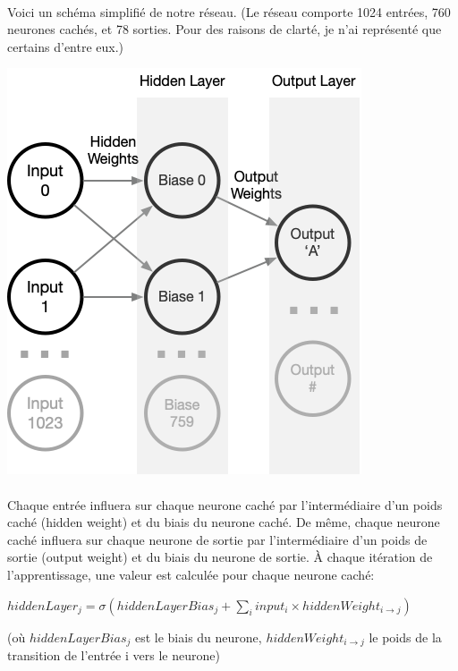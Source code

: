 \documentclass{article}
\begin{document}
\paragraph{}Voici un schéma simplifié de notre réseau.
(Le réseau comporte 1024 entrées, 760 neurones cachés, et 78 sorties. Pour des raisons de clarté, je n'ai représenté que certains d'entre eux.)

\begin{center}
	\includegraphics[scale=0.5]{Neuron}
\end{center}

\paragraph{} Chaque entrée influera sur chaque neurone caché par l’intermédiaire d’un poids caché (hidden weight) et du biais du neurone caché.
De même, chaque neurone caché influera sur chaque neurone de sortie par l’intermédiaire d’un poids de sortie (output weight) et du biais du neurone de sortie.
À chaque itération de l’apprentissage, une valeur est calculée pour chaque neurone caché:
\newline

$hiddenLayer_j=\sigma(hiddenLayerBias_j+\sum_i input_i\times hiddenWeight_{i\rightarrow j})$

(où $hiddenLayerBias_j$ est le biais du neurone, $hiddenWeight_{i\rightarrow j}$ le poids de la transition de l’entrée i vers le neurone)
\end{document}

